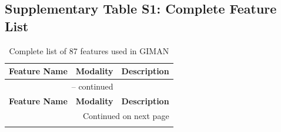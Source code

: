 \documentclass[11pt]{article}
\begin{document}
\subsection{Supplementary Table S1: Complete Feature List}

\begin{longtable}{p{} p{} p{}}
\caption{Complete list of 87 features used in GIMAN} \\
\toprule
\textbf{Feature Name} & \textbf{Modality} & \textbf{Description} \\
\midrule
\endfirsthead
\multicolumn{3}{c}{{\tablename\ \thetable{} -- continued}} \\
\toprule
\textbf{Feature Name} & \textbf{Modality} & \textbf{Description} \\
\midrule
\endhead
\midrule
\multicolumn{3}{r}{{Continued on next page}} \\
\endfoot
\bottomrule
\endlastfoot


\end{longtable}
\end{document}
